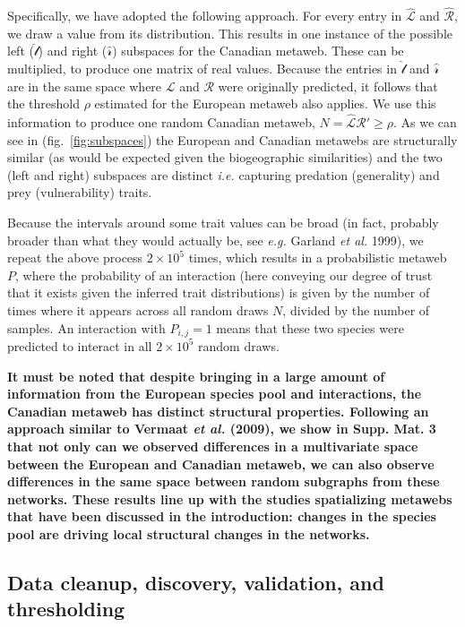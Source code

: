 \documentclass[11pt]{article}
\makeatletter
\def\maxwidth{\ifdim\Gin@nat@width>\linewidth\linewidth
\else\Gin@nat@width\fi}
\let\Oldincludegraphics\includegraphics
\renewcommand{\includegraphics}[1]{\Oldincludegraphics[width=\maxwidth]{#1}}
\providecommand{\DIFaddtex}[1]{{\bf #1}} %
\providecommand{\DIFaddbegin}{\protect\color{blue}} %
\providecommand{\DIFaddend}{\protect\color{black}} %
\providecommand{\DIFadd}[1]{\texorpdfstring{\DIFaddtex{#1}}{#1}} %
\newcommand{\DIFaddincludegraphics}[2][]{{\color{blue}\fbox{\DIFOincludegraphics[#1]{#2}}}} %
\DeclareRobustCommand{\DIFaddbegin}{\DIFOaddbegin \let\includegraphics\DIFaddincludegraphics} %
\DeclareRobustCommand{\DIFaddend}{\DIFOaddend \let\includegraphics\DIFOincludegraphics} %
\makeatother
\begin{document}
Specifically, we have adopted the following approach. For every entry in
\(\hat{\mathscr{L}}\) and \(\hat{\mathscr{R}}\), we draw a value from
its distribution. This results in one instance of the possible left
(\(\hat{\mathscr{l}}\)) and right (\(\hat{\mathscr{r}}\)) subspaces for
the Canadian metaweb. These can be multiplied, to produce one matrix of
real values. Because the entries in \(\hat{\mathscr{l}}\) and
\(\hat{\mathscr{r}}\) are in the same space where \(\mathscr{L}\) and
\(\mathscr{R}\) were originally predicted, it follows that the threshold
\(\rho\) estimated for the European metaweb also applies. We use this
information to produce one random Canadian metaweb,
\(N = \hat{\mathscr{L}}\)\(\hat{\mathscr{R}}' \ge \rho\). As we can see
in (fig.~\ref{fig:subspaces}) the European and Canadian metawebs are
structurally similar (as would be expected given the biogeographic
similarities) and the two (left and right) subspaces are distinct
\emph{i.e.} capturing predation (generality) and prey (vulnerability)
traits.

Because the intervals around some trait values can be broad (in fact,
probably broader than what they would actually be, see \emph{e.g.}
Garland \emph{et al.} 1999), we repeat the above process
\(2\times 10^5\) times, which results in a probabilistic metaweb \(P\),
where the probability of an interaction (here conveying our degree of
trust that it exists given the inferred trait distributions) is given by
the number of times where it appears across all random draws \(N\),
divided by the number of samples. An interaction with \(P_{i,j} = 1\)
means that these two species were predicted to interact in all
\(2\times 10^5\) random draws.

\DIFaddbegin \DIFadd{It must be noted that despite bringing in a large amount of information
from the European species pool and interactions, the Canadian metaweb
has distinct structural properties. Following an approach similar to
Vermaat \emph{et al.} (2009), we show in Supp. Mat. 3 that not only can
we observed differences in a multivariate space between the European and
Canadian metaweb, we can also observe differences in the same space
between random subgraphs from these networks. These results line up with
the studies spatializing metawebs that have been discussed in the
introduction: changes in the species pool are driving local structural
changes in the networks.
}

\DIFaddend \hypertarget{data-cleanup-discovery-validation-and-thresholding}{%
\subsection{Data cleanup, discovery, validation, and
thresholding}\label{data-cleanup-discovery-validation-and-thresholding}}
\end{document}
